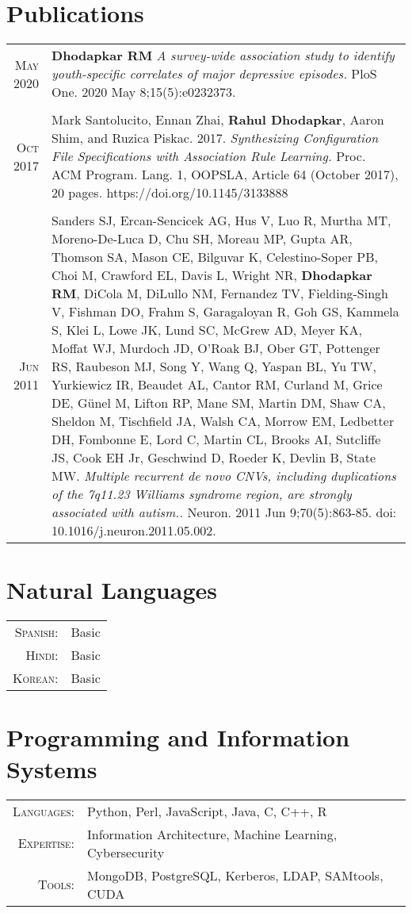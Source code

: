 \documentclass[a4paper,10pt]{article}
\begin{document}
\section{Publications}
\begin{tabular}{rp{11cm}}
 \textsc{May} 2020 & {\bf Dhodapkar RM} {\it A survey-wide association study to identify youth-specific correlates of major depressive episodes.} PloS One. 2020 May 8;15(5):e0232373. \\
\multicolumn{2}{c}{} \\
 \textsc{Oct} 2017 & Mark Santolucito, Ennan Zhai, {\bf Rahul Dhodapkar}, Aaron Shim, and Ruzica Piskac. 2017. {\it Synthesizing Configuration
File Specifications with Association Rule Learning.} Proc. ACM Program. Lang. 1, OOPSLA, Article 64
(October 2017), 20 pages. https://doi.org/10.1145/3133888 \\
\multicolumn{2}{c}{} \\
 \textsc{Jun} 2011 & Sanders SJ, Ercan-Sencicek AG, Hus V, Luo R, Murtha MT, Moreno-De-Luca D, Chu SH, Moreau MP, Gupta AR, Thomson SA, Mason CE, Bilguvar K, Celestino-Soper PB, Choi M, Crawford EL, Davis L, Wright NR, {\bf Dhodapkar RM}, DiCola M, DiLullo NM, Fernandez TV, Fielding-Singh V, Fishman DO, Frahm S, Garagaloyan R, Goh GS, Kammela S, Klei L, Lowe JK, Lund SC, McGrew AD, Meyer KA, Moffat WJ, Murdoch JD, O'Roak BJ, Ober GT, Pottenger RS, Raubeson MJ, Song Y, Wang Q, Yaspan BL, Yu TW, Yurkiewicz IR, Beaudet AL, Cantor RM, Curland M, Grice DE, Günel M, Lifton RP, Mane SM, Martin DM, Shaw CA, Sheldon M, Tischfield JA, Walsh CA, Morrow EM, Ledbetter DH, Fombonne E, Lord C, Martin CL, Brooks AI, Sutcliffe JS, Cook EH Jr, Geschwind D, Roeder K, Devlin B, State MW. {\it Multiple recurrent de novo CNVs, including duplications of the 7q11.23 Williams syndrome region, are strongly associated with autism..} Neuron. 2011 Jun 9;70(5):863-85. doi: 10.1016/j.neuron.2011.05.002. 
\end{tabular}

\section{Natural Languages}
\begin{tabular}{rl}
\textsc{Spanish:}&Basic\\
\textsc{Hindi:}&Basic\\
\textsc{Korean:}&Basic\\
\end{tabular}

\section{Programming and Information Systems}
\begin{tabular}{rl}
\textsc{Languages:}&Python, Perl, JavaScript, Java, C, C++, R\\
\textsc{Expertise:}&Information Architecture, Machine Learning, Cybersecurity\\
\textsc{Tools:}&MongoDB, PostgreSQL, Kerberos, LDAP, SAMtools, CUDA
\end{tabular}
\end{document}
